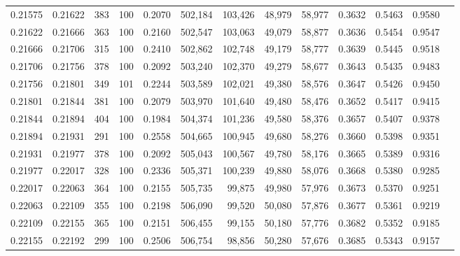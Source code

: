 \begin{tabular}{rrrrrrrrrrrrr}
0.21575 & 0.21622 &   383 & 100 &                                     0.2070 & 502,184 & 103,426 &  48,979 &  58,977 & 0.3632 & 0.5463 & 0.9580 \\
0.21622 & 0.21666 &   363 & 100 &                                     0.2160 & 502,547 & 103,063 &  49,079 &  58,877 & 0.3636 & 0.5454 & 0.9547 \\
0.21666 & 0.21706 &   315 & 100 &                                     0.2410 & 502,862 & 102,748 &  49,179 &  58,777 & 0.3639 & 0.5445 & 0.9518 \\
0.21706 & 0.21756 &   378 & 100 &                                     0.2092 & 503,240 & 102,370 &  49,279 &  58,677 & 0.3643 & 0.5435 & 0.9483 \\
0.21756 & 0.21801 &   349 & 101 &                                     0.2244 & 503,589 & 102,021 &  49,380 &  58,576 & 0.3647 & 0.5426 & 0.9450 \\
0.21801 & 0.21844 &   381 & 100 &                                     0.2079 & 503,970 & 101,640 &  49,480 &  58,476 & 0.3652 & 0.5417 & 0.9415 \\
0.21844 & 0.21894 &   404 & 100 &                                     0.1984 & 504,374 & 101,236 &  49,580 &  58,376 & 0.3657 & 0.5407 & 0.9378 \\
0.21894 & 0.21931 &   291 & 100 &                                     0.2558 & 504,665 & 100,945 &  49,680 &  58,276 & 0.3660 & 0.5398 & 0.9351 \\
0.21931 & 0.21977 &   378 & 100 &                                     0.2092 & 505,043 & 100,567 &  49,780 &  58,176 & 0.3665 & 0.5389 & 0.9316 \\
0.21977 & 0.22017 &   328 & 100 &                                     0.2336 & 505,371 & 100,239 &  49,880 &  58,076 & 0.3668 & 0.5380 & 0.9285 \\
0.22017 & 0.22063 &   364 & 100 &                                     0.2155 & 505,735 &  99,875 &  49,980 &  57,976 & 0.3673 & 0.5370 & 0.9251 \\
0.22063 & 0.22109 &   355 & 100 &                                     0.2198 & 506,090 &  99,520 &  50,080 &  57,876 & 0.3677 & 0.5361 & 0.9219 \\
0.22109 & 0.22155 &   365 & 100 &                                     0.2151 & 506,455 &  99,155 &  50,180 &  57,776 & 0.3682 & 0.5352 & 0.9185 \\
0.22155 & 0.22192 &   299 & 100 &                                     0.2506 & 506,754 &  98,856 &  50,280 &  57,676 & 0.3685 & 0.5343 & 0.9157 \\

\end{tabular}

